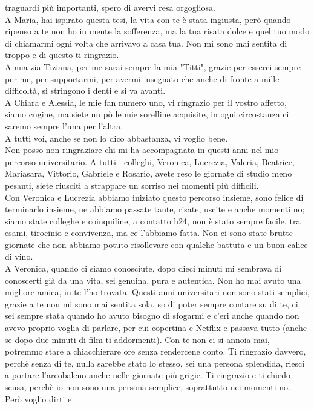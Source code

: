 traguardi più importanti, spero di avervi resa orgogliosa.\\
A Maria, hai ispirato questa tesi, la vita con te è stata ingiusta, però quando ripenso a te non ho in mente
la sofferenza, ma la tua risata dolce e quel tuo modo di chiamarmi ogni volta che arrivavo a casa tua. Non mi sono mai 
sentita di troppo e di questo ti ringrazio.\\
A mia zia Tiziana, per me sarai sempre la mia "Titti", grazie per esserci sempre per me, per supportarmi, per avermi
insegnato che anche di fronte a mille difficoltà, si stringono i denti e si va avanti.\\
A Chiara e Alessia, le mie fan numero uno, vi ringrazio per il vostro affetto, siamo cugine, ma siete un pò le mie 
sorelline acquisite, in ogni circostanza ci saremo sempre l’una per l’altra.\\
A tutti voi, anche se non lo dico abbastanza, vi voglio bene.\\
Non posso non ringraziare chi mi ha accompagnata in questi anni nel mio percorso universitario. A tutti i colleghi, 
Veronica, Lucrezia, Valeria, Beatrice, Mariasara, Vittorio, Gabriele e Rosario, avete reso le giornate di studio meno 
pesanti, siete riusciti a strappare un sorriso nei momenti più difficili.\\
Con Veronica e Lucrezia abbiamo iniziato questo percorso insieme, sono felice di terminarlo insieme, ne abbiamo passate 
tante, risate, uscite e anche momenti no; siamo state colleghe e coinquiline, a contatto h24, non è stato sempre facile, 
tra esami, tirocinio e convivenza, ma ce l’abbiamo fatta. Non ci sono state brutte giornate che non abbiamo 
potuto risollevare con qualche battuta e un buon calice di vino.\\
A Veronica, quando ci siamo conosciute, dopo dieci minuti mi sembrava di conoscerti già da 
una vita, sei genuina, pura e autentica. Non ho mai avuto una migliore amica, in te l’ho trovata. Questi anni universitari 
non sono stati semplici, grazie a te non mi sono mai sentita sola, so di poter sempre contare su di te, ci sei sempre 
stata quando ho avuto bisogno di sfogarmi e c’eri anche quando non avevo proprio voglia di parlare, per cui copertina e Netflix
e passava tutto (anche se dopo due minuti di film ti addormenti). 
Con te non ci si annoia mai, potremmo stare a chiacchierare ore senza rendercene conto. 
Ti ringrazio davvero, perchè senza di te, nulla sarebbe stato lo stesso, 
sei una persona splendida, riesci a portare l’arcobaleno anche nelle giornate più grigie. 
Ti ringrazio e ti chiedo scusa, perchè io non sono una persona semplice, soprattutto nei momenti no. Però voglio dirti e 
